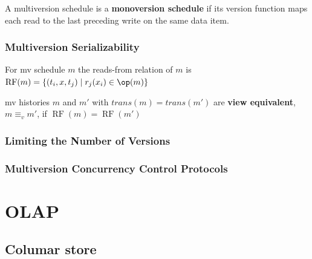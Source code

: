\documentclass[11pt]{article}
\DeclareMathOperator{\RF}{\text{RF}}
\begin{document}
\begin{definition}[]
A multiversion schedule is a \textbf{monoversion schedule} if its version function maps each read to the
last preceding write on the same data item.
\end{definition}
\subsubsection{Multiversion Serializability}
\label{sec:orgcd473b3}
\begin{definition}[]
For mv schedule \(m\) the reads-from relation of \(m\) is \(\RF(m)=\{(t_i,x,t_j)\mid r_j(x_i)\in\op(m)\}\)
\end{definition}

\begin{definition}[]
mv histories \(m\) and \(m'\) with \(trans(m)=trans(m')\) are \textbf{view equivalent}, \(m\equiv_vm'\), if \(\RF(m)=\RF(m')\)
\end{definition}
\subsubsection{Limiting the Number of Versions}
\label{sec:org3f4f53c}
\subsubsection{Multiversion Concurrency Control Protocols}
\label{sec:org7554f43}
\section{OLAP}
\label{sec:org63c74d6}
\subsection{Columar store}
\label{sec:org43ee4e0}
\end{document}
